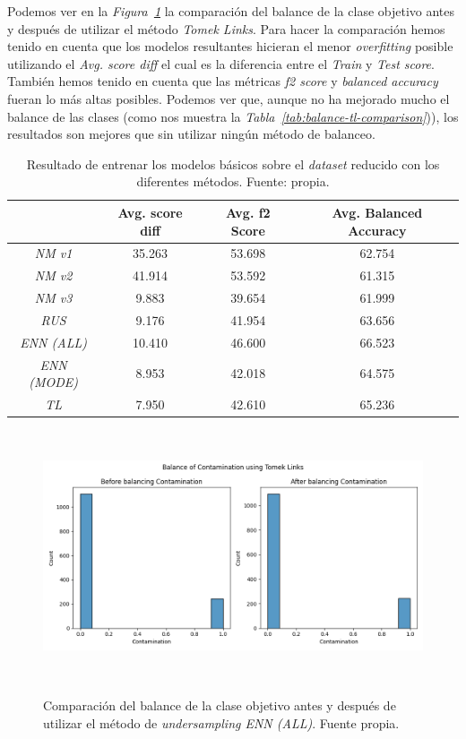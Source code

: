 Podemos ver en la \textit{Figura\ \ref{fig:balance-tl}} la comparación del balance de la clase objetivo antes y después de utilizar el método \textit{Tomek Links}. Para hacer la comparación hemos tenido en cuenta que los modelos resultantes hicieran el menor \textit{overfitting} posible utilizando el \textit{Avg. score diff} el cual es la diferencia entre el \textit{Train} y \textit{Test score}. También hemos tenido en cuenta que las métricas \textit{f2 score} y \textit{balanced accuracy} fueran lo más altas posibles. Podemos ver que, aunque no ha mejorado mucho el balance de las clases (como nos muestra la \textit{Tabla\ \ref{tab:balance-tl-comparison}})), los resultados son mejores que sin utilizar ningún método de balanceo.

\begin{table}[!ht]
    \centering
    \begin{tabular}{|c|ccc|} \hline
        & Avg. score diff & Avg. f2 Score & Avg. Balanced Accuracy \\ \hline
        \textit{NM v1} & 35.263 & 53.698 & 62.754 \\
        \textit{NM v2} & 41.914 & 53.592 & 61.315 \\
        \textit{NM v3} & 9.883 & 39.654 & 61.999 \\
        \textit{RUS} & 9.176 & 41.954 & 63.656 \\
        \textit{ENN (ALL)} & 10.410 & 46.600 & 66.523 \\
        \textit{ENN (MODE)} & 8.953 & 42.018 & 64.575 \\
        \textit{TL} & 7.950 & 42.610 & 65.236 \\ \hline
    \end{tabular}
    \caption{Resultado de entrenar los modelos básicos sobre el \textit{dataset} reducido con los diferentes métodos. Fuente: propia.}\ \label{tab:undersampling-methods}
\end{table}

\begin{figure}[!ht]
    \centering
    \includegraphics[width=0.8\linewidth]{media/images/balance.png}
    \caption{Comparación del balance de la clase objetivo antes y después de utilizar el método de \textit{undersampling ENN (ALL)}. Fuente propia.}\ \label{fig:balance-tl}
\end{figure}

